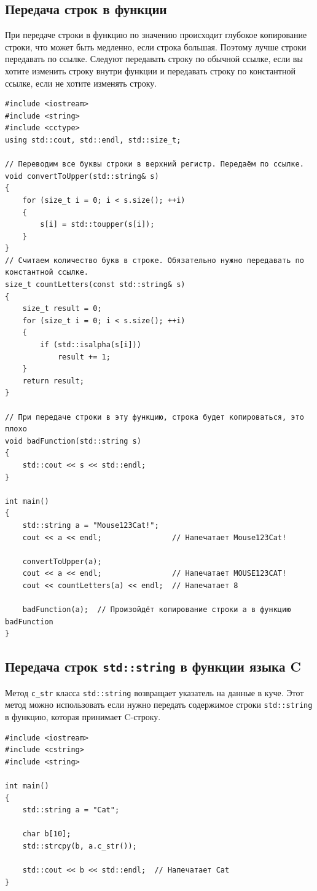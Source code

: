 \documentclass{article}
\begin{document}
\subsection*{Передача строк в функции}
При передаче строки в функцию по значению происходит глубокое копирование строки, что может быть медленно, если строка большая. Поэтому лучше строки передавать по ссылке. Следуют передавать строку по обычной ссылке, если вы хотите изменить строку внутри функции и передавать строку по константной ссылке, если не хотите изменять строку.
\begin{lstlisting}
#include <iostream>
#include <string>
#include <cctype>
using std::cout, std::endl, std::size_t;

// Переводим все буквы строки в верхний регистр. Передаём по ссылке.
void convertToUpper(std::string& s)
{
    for (size_t i = 0; i < s.size(); ++i)
    {
        s[i] = std::toupper(s[i]);
    }
}
// Считаем количество букв в строке. Обязательно нужно передавать по константной ссылке.
size_t countLetters(const std::string& s)
{
    size_t result = 0;
    for (size_t i = 0; i < s.size(); ++i)
    {
        if (std::isalpha(s[i]))
            result += 1;
    }
    return result;
}

// При передаче строки в эту функцию, строка будет копироваться, это плохо
void badFunction(std::string s)
{
    std::cout << s << std::endl;
}

int main()
{
    std::string a = "Mouse123Cat!";
    cout << a << endl;                // Напечатает Mouse123Cat!
    
    convertToUpper(a);
    cout << a << endl;                // Напечатает MOUSE123CAT!
    cout << countLetters(a) << endl;  // Напечатает 8
    
    badFunction(a);  // Произойдёт копирование строки a в функцию badFunction
}
\end{lstlisting}

\newpage

\subsection*{Передача строк \texttt{std::string} в функции языка C}
Метод \texttt{c\_str} класса \texttt{std::string} возвращает указатель на данные в куче. Этот метод можно использовать если нужно передать содержимое строки \texttt{std::string} в функцию, которая принимает C-строку.
\begin{lstlisting}
#include <iostream>
#include <cstring>
#include <string>

int main()
{
    std::string a = "Cat";
    
    char b[10];
    std::strcpy(b, a.c_str());

    std::cout << b << std::endl;  // Напечатает Cat
}
\end{lstlisting}
\end{document}
